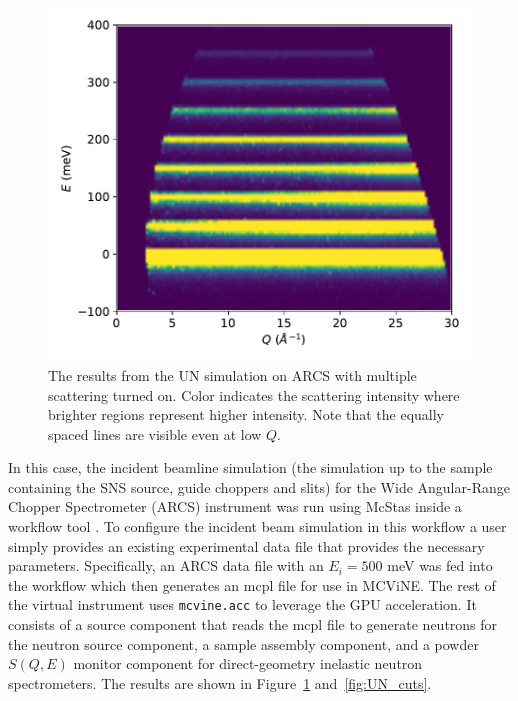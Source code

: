 \begin{figure}[h]
\centering
\includegraphics[width=\columnwidth]{figures/UN-ARCS-iqe.pdf}
\caption{The results from the UN simulation on ARCS with multiple scattering turned on. Color indicates the scattering intensity where brighter regions represent higher intensity. Note that the equally spaced lines are visible even at low $Q$.}
\label{fig:UN_plot}
\end{figure}

In this case, the incident beamline simulation (the simulation up to the sample containing the SNS source, guide choppers and slits) for the Wide Angular-Range Chopper Spectrometer (ARCS) instrument \cite{abernathy2012arcs, stone2014comparison} was run using McStas \cite{Willendrup:2020aa,Willendrup:2021aa} inside a workflow tool \cite{10.1007/978-3-031-23606-8_9}.
To configure the incident beam simulation in this workflow a user simply provides an existing experimental data file that provides the necessary parameters.
Specifically, an ARCS data file with an $E_i = 500$ meV was fed into the workflow which then generates an mcpl \cite{KITTELMANN201717} file \cite{data_doi} for use in MCViNE.
The rest of the virtual instrument uses \texttt{mcvine.acc} to leverage the GPU acceleration. It consists of a source component that reads the mcpl file to generate neutrons for the neutron source component,  a sample assembly component, and a powder $S(Q, E)$ monitor component for direct-geometry inelastic neutron spectrometers.
The results are shown in Figure~\ref{fig:UN_plot} and~\ref{fig:UN_cuts}.

